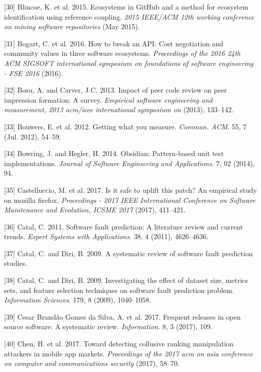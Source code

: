 \documentclass[]{book}
\begin{document}
\hypertarget{ref-Blincoe2015}{}
{[}30{]} Blincoe, K. et al. 2015. Ecosystems in GitHub and a method for
ecosystem identification using reference coupling. \emph{2015 IEEE/ACM
12th working conference on mining software repositories} (May 2015).

\hypertarget{ref-Bogart2016}{}
{[}31{]} Bogart, C. et al. 2016. How to break an API: Cost negotiation
and community values in three software ecosystems. \emph{Proceedings of
the 2016 24th ACM SIGSOFT international symposium on foundations of
software engineering - FSE 2016} (2016).

\hypertarget{ref-bosu2013impact}{}
{[}32{]} Bosu, A. and Carver, J.C. 2013. Impact of peer code review on
peer impression formation: A survey. \emph{Empirical software
engineering and measurement, 2013 acm/ieee international symposium on}
(2013), 133--142.

\hypertarget{ref-bouwers2012a}{}
{[}33{]} Bouwers, E. et al. 2012. Getting what you measure.
\emph{Commun. ACM}. 55, 7 (Jul. 2012), 54--59.

\hypertarget{ref-bowring2014obsidian}{}
{[}34{]} Bowring, J. and Hegler, H. 2014. Obsidian: Pattern-based unit
test implementations. \emph{Journal of Software Engineering and
Applications}. 7, 02 (2014), 94.

\hypertarget{ref-castelluccio2017a}{}
{[}35{]} Castelluccio, M. et al. 2017. Is it safe to uplift this patch?
An empirical study on mozilla firefox. \emph{Proceedings - 2017 IEEE
International Conference on Software Maintenance and Evolution, ICSME
2017} (2017), 411--421.

\hypertarget{ref-Catal2011}{}
{[}36{]} Catal, C. 2011. Software fault prediction: A literature review
and current trends. \emph{Expert Systems with Applications}. 38, 4
(2011), 4626--4636.

\hypertarget{ref-Catal2009review}{}
{[}37{]} Catal, C. and Diri, B. 2009. A systematic review of software
fault prediction studies.

\hypertarget{ref-Catal2009investigating}{}
{[}38{]} Catal, C. and Diri, B. 2009. Investigating the effect of
dataset size, metrics sets, and feature selection techniques on software
fault prediction problem. \emph{Information Sciences}. 179, 8 (2009),
1040--1058.

\hypertarget{ref-cesar2017a}{}
{[}39{]} Cesar Brandão Gomes da Silva, A. et al. 2017. Frequent releases
in open source software: A systematic review. \emph{Information}. 8, 3
(2017), 109.

\hypertarget{ref-chen2017toward}{}
{[}40{]} Chen, H. et al. 2017. Toward detecting collusive ranking
manipulation attackers in mobile app markets. \emph{Proceedings of the
2017 acm on asia conference on computer and communications security}
(2017), 58--70.
\end{document}

